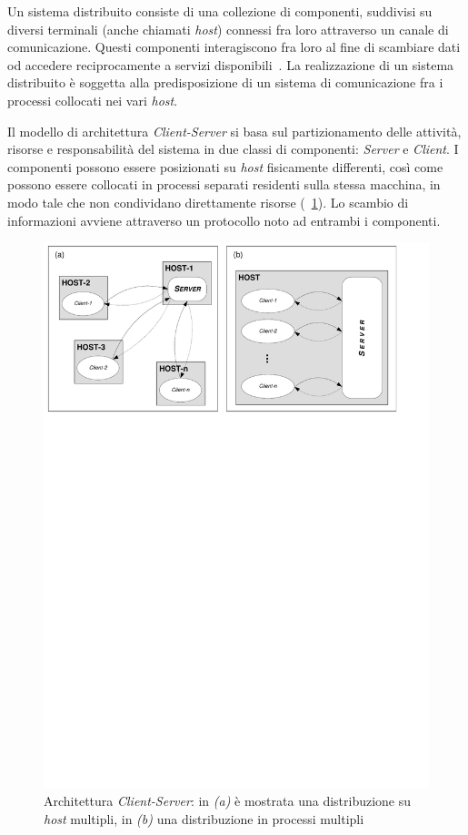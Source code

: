 Un sistema distribuito consiste di una collezione di componenti, suddivisi su diversi terminali (anche chiamati \emph{host}) connessi fra loro attraverso un canale di comunicazione. Questi componenti interagiscono fra loro al fine di scambiare dati od accedere reciprocamente a servizi disponibili~\cite{Mascolo:2002:MCM:770420.770423}.
La realizzazione di un sistema distribuito è soggetta alla predisposizione di un sistema di comunicazione fra i processi collocati nei vari \emph{host}.

Il modello di architettura \emph{Client-Server} si basa sul partizionamento delle attività, risorse e responsabilità del sistema in due classi di componenti: \emph{Server} e \emph{Client}.
I componenti possono essere posizionati su \emph{host} fisicamente differenti, così come possono essere collocati in processi separati residenti sulla stessa macchina, in modo tale che non condividano direttamente risorse (\figurename~\ref{fig:client-server}). Lo scambio di informazioni avviene attraverso un protocollo noto ad entrambi i componenti.

\begin{figure}[h]
\centering
\includegraphics[scale=0.7, viewport=6 582 546 838]{Immagini/Capitolo2/Client-Server.pdf}
\caption[Architettura \emph{Client-Server}]{Architettura \emph{Client-Server}: in \emph{(a)} è mostrata una distribuzione su \emph{host} multipli, in \emph{(b)} una distribuzione in processi multipli}\label{fig:client-server}
\end{figure}


